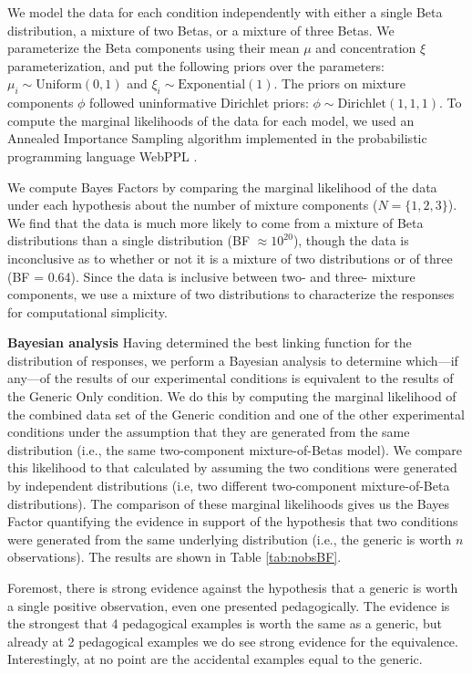 \documentclass[10pt,letterpaper]{article}
\begin{document}
We model the data for each condition independently with either a single Beta distribution, a mixture of two Betas, or a mixture of three Betas.
We parameterize the Beta components using their mean $\mu$ and concentration $\xi$ parameterization, and put the following priors over the parameters: $\mu_i \sim \text{Uniform}(0,1)$ and $\xi_i \sim \text{Exponential}(1)$. 
The priors on mixture components $\phi$ followed uninformative Dirichlet priors: $\phi \sim \text{Dirichlet}(1, 1, 1)$.
To compute the marginal likelihoods of the data for each model, we used an Annealed Importance Sampling algorithm \cite{neal2001annealed} implemented in the probabilistic programming language WebPPL \cite{dippl}. 

We compute Bayes Factors by comparing the marginal likelihood of the data under each hypothesis about the number of mixture components ($N = \{1, 2, 3\}$).
We find that the data is much more likely to come from a mixture of Beta distributions than a single distribution (BF $\approx 10^{20}$), though the data is inconclusive as to whether or not it is a mixture of two distributions or of three (BF = 0.64). %
Since the data is inclusive between two- and three- mixture components, we use a mixture of two distributions to characterize the responses for computational simplicity. 

\noindent\textbf{Bayesian analysis}
Having determined the best linking function for the distribution of responses, we perform a Bayesian analysis to determine which---if any---of the results of our experimental conditions is equivalent to the results of the Generic Only condition. 
We do this by computing the marginal likelihood of the combined data set of the Generic condition and one of the other experimental conditions under the assumption that they are generated from the same distribution (i.e., the same two-component mixture-of-Betas model). 
We compare this likelihood to that calculated by assuming the two conditions were generated by independent distributions (i.e, two different two-component mixture-of-Beta distributions). 
The comparison of these marginal likelihoods gives us the Bayes Factor quantifying the evidence in support of the hypothesis that two conditions were generated from the same underlying distribution (i.e., the generic is worth $n$ observations). 
The results are shown in Table \ref{tab:nobsBF}.

Foremost, there is strong evidence against the hypothesis that a generic is worth a single positive observation, even one presented pedagogically.
The evidence is the strongest that 4 pedagogical examples is worth the same as a generic, but already at 2 pedagogical examples we do see strong evidence for the equivalence. 
Interestingly, at no point are the accidental examples equal to the generic.
\end{document}
